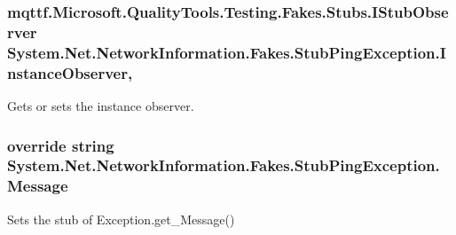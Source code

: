 \hypertarget{class_system_1_1_net_1_1_network_information_1_1_fakes_1_1_stub_ping_exception_a068d0146c2dd258e0a8a83caad8460ce}{
\subsubsection[{Instance\-Observer}]{\setlength{\rightskip}{0pt plus 5cm}mqttf.\-Microsoft.\-Quality\-Tools.\-Testing.\-Fakes.\-Stubs.\-I\-Stub\-Observer System.\-Net.\-Network\-Information.\-Fakes.\-Stub\-Ping\-Exception.\-Instance\-Observer\hspace{0.3cm}{\ttfamily [get]}, {\ttfamily [set]}}}\label{class_system_1_1_net_1_1_network_information_1_1_fakes_1_1_stub_ping_exception_a068d0146c2dd258e0a8a83caad8460ce}


Gets or sets the instance observer.

\hypertarget{class_system_1_1_net_1_1_network_information_1_1_fakes_1_1_stub_ping_exception_adadecc1fe2dc44d98e847b9827a4407a}{
\subsubsection[{Message}]{\setlength{\rightskip}{0pt plus 5cm}override string System.\-Net.\-Network\-Information.\-Fakes.\-Stub\-Ping\-Exception.\-Message\hspace{0.3cm}{\ttfamily [get]}}}\label{class_system_1_1_net_1_1_network_information_1_1_fakes_1_1_stub_ping_exception_adadecc1fe2dc44d98e847b9827a4407a}


Sets the stub of Exception.\-get\-\_\-\-Message()

